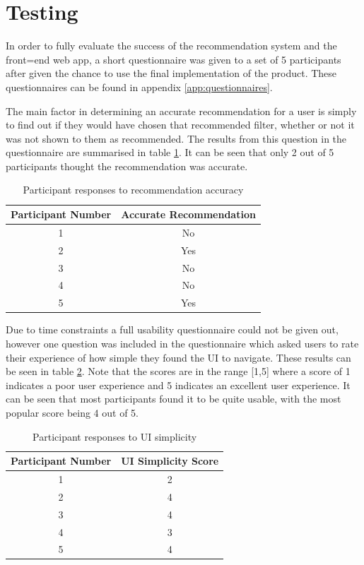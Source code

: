 \documentclass[a4paper,12pt]{report}
\begin{document}
  \section{Testing} \label{sec:testing}
    In order to fully evaluate the success of the recommendation system and the front=end web app, a short questionnaire was given to a set of 5 participants after given the chance to use the final implementation of the product. These questionnaires can be found in appendix \ref{app:questionnaires}.

    The main factor in determining an accurate recommendation for a user is simply to find out if they would have chosen that recommended filter, whether or not it was not shown to them as recommended. The results from this question in the questionnaire are summarised in table \ref{tab:participant-recc-accuracy}. It can be seen that only 2 out of 5 participants thought the recommendation was accurate.

    \begin{table}[h]
      \centering
        \begin{tabular}{c|c}
        \toprule
        \textbf{Participant Number} & \textbf{Accurate Recommendation} \\
        \midrule
        1     & No \\
        2     & Yes \\
        3     & No \\
        4     & No \\
        5     & Yes \\
        \bottomrule
        \end{tabular}%
        \caption{Participant responses to recommendation accuracy}
      \label{tab:participant-recc-accuracy}%
    \end{table}%

    Due to time constraints a full usability questionnaire could not be given out, however one question was included in the questionnaire which asked users to rate their experience of how simple they found the UI to navigate. These results can be seen in table \ref{tab:participant-ui-simplicity}. Note that the scores are in the range [1,5] where a score of 1 indicates a poor user experience and 5 indicates an excellent user experience. It can be seen that most participants found it to be quite usable, with the most popular score being 4 out of 5.

    \begin{table}[h]
      \centering
        \begin{tabular}{c|c}
        \toprule
        \textbf{Participant Number} & \textbf{UI Simplicity Score} \\
        \midrule
        1     & 2 \\
        2     & 4 \\
        3     & 4 \\
        4     & 3 \\
        5     & 4 \\
        \bottomrule
        \end{tabular}%
        \caption{Participant responses to UI simplicity}
      \label{tab:participant-ui-simplicity}%
    \end{table}%
\end{document}
